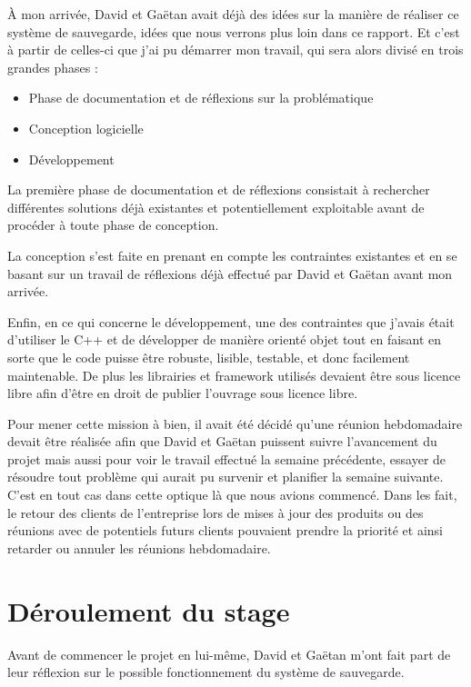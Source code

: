 \documentclass[a4paper,10pt, twoside]{report}
\begin{document}
\begin{spacing}{1.2}
\`A mon arriv\'ee, David et Ga\"etan avait d\'ej\`a des id\'ees sur la
mani\`ere de r\'ealiser ce syst\`eme de sauvegarde, id\'ees que nous verrons
plus loin dans ce rapport. Et c'est \`a partir de celles-ci que j'ai pu
d\'emarrer mon travail, qui sera alors divis\'e en trois grandes phases :

\begin{itemize}
 \item Phase de documentation et de r\'eflexions sur la probl\'ematique
 \item Conception logicielle
 \item D\'eveloppement
\end{itemize}

La premi\`ere phase de documentation et de r\'eflexions consistait \`a
rechercher diff\'erentes solutions d\'ej\`a existantes et potentiellement
exploitable avant de proc\'eder \`a toute phase de conception.

La conception s'est faite en prenant en compte les contraintes existantes
et en se basant sur un travail de r\'eflexions d\'ej\`a effectu\'e par David et
Ga\"etan avant mon arriv\'ee.

Enfin, en ce qui concerne le d\'eveloppement, une des contraintes que j'avais
\'etait d'utiliser le C++ et de d\'evelopper de mani\`ere orient\'e objet tout
en faisant en sorte que le code puisse \^etre robuste, lisible, testable, et
donc facilement maintenable. De plus les librairies et framework utilis\'es
devaient \^etre sous licence libre afin d'\^etre en droit de publier l'ouvrage
sous licence libre.

Pour mener cette mission \`a bien, il avait \'et\'e d\'ecid\'e qu'une r\'eunion
hebdomadaire devait \^etre r\'ealis\'ee afin que David et Ga\"etan puissent
suivre l'avancement du projet mais aussi pour voir le travail effectu\'e la
semaine pr\'ec\'edente, essayer de r\'esoudre tout probl\`eme qui aurait pu
survenir et planifier la semaine suivante.
C'est en tout cas dans cette optique l\`a que nous avions commenc\'e. Dans les
fait, le retour des clients de l'entreprise lors de mises \`a jour des produits
ou des r\'eunions avec de potentiels futurs clients pouvaient prendre la
priorit\'e et ainsi retarder ou annuler les r\'eunions hebdomadaire.

\chapter{D\'eroulement du stage}
\thispagestyle{fancy}
Avant de commencer le projet en lui-m\^eme, David et Ga\"etan m'ont fait part
de leur r\'eflexion sur le possible fonctionnement du syst\`eme de sauvegarde.


\end{spacing}
\end{document}
